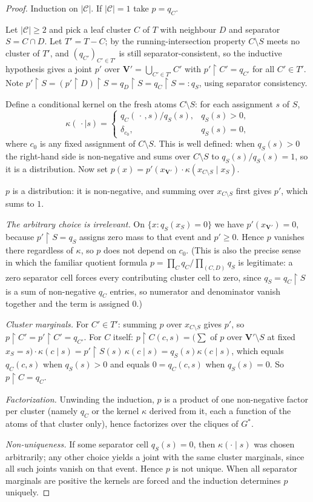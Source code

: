 \documentclass[11pt]{article}
\theoremstyle{definition}
\newcommand{\restr}{\!\restriction\!}
\begin{document}
\begin{proof}
Induction on $|\mathcal C|$. If $|\mathcal C|=1$ take $p=q_C$.

Let $|\mathcal C|\ge2$ and pick a leaf cluster $C$ of $T$ with neighbour $D$ and
separator $S=C\cap D$. Let $T'=T-C$; by the running-intersection property
$C\setminus S$ meets no cluster of $T'$, and $(q_{C'})_{C'\in T'}$ is still
separator-consistent, so the inductive hypothesis gives a joint $p'$ over
$\mathbf V'=\bigcup_{C'\in T'}C'$ with $p'\restr C'=q_{C'}$ for all
$C'\in T'$. Note
$p'\restr S=(p'\restr D)\restr S=q_D\restr S=q_C\restr S=:q_S$, using separator
consistency.

Define a conditional kernel on the fresh atoms $C\setminus S$: for each
assignment $s$ of $S$,
\[
  \kappa(\,\cdot\mid s)=
  \begin{cases}
    q_C(\,\cdot\,,s)/q_S(s), & q_S(s)>0,\\
    \delta_{c_0}, & q_S(s)=0,
  \end{cases}
\]
where $c_0$ is any fixed assignment of $C\setminus S$. This is well defined: when
$q_S(s)>0$ the right-hand side is non-negative and sums over $C\setminus S$ to
$q_S(s)/q_S(s)=1$, so it is a distribution. Now set
$p(x)=p'(x_{\mathbf V'})\cdot\kappa(x_{C\setminus S}\mid x_S)$.

$p$ is a distribution: it is non-negative, and summing over $x_{C\setminus S}$
first gives $p'$, which sums to $1$.

\emph{The arbitrary choice is irrelevant.} On $\{x:q_S(x_S)=0\}$ we have
$p'(x_{\mathbf V'})=0$, because $p'\restr S=q_S$ assigns zero mass to that event
and $p'\ge0$. Hence $p$ vanishes there regardless of $\kappa$, so $p$ does not
depend on $c_0$. (This is also the precise sense in which the familiar quotient
formula $p=\prod_C q_C/\prod_{(C,D)}q_S$ is legitimate: a zero separator cell
forces every contributing cluster cell to zero, since $q_S=q_C\restr S$ is a sum
of non-negative $q_C$ entries, so numerator and denominator vanish together and
the term is assigned $0$.)

\emph{Cluster marginals.} For $C'\in T'$: summing $p$ over $x_{C\setminus S}$
gives $p'$, so $p\restr C'=p'\restr C'=q_{C'}$. For $C$ itself:
$p\restr C(c,s)=\bigl(\sum$ of $p$ over $\mathbf V'\setminus S$ at fixed
$x_S=s\bigr)\cdot\kappa(c\mid s)=p'\restr S(s)\,\kappa(c\mid s)
=q_S(s)\kappa(c\mid s)$, which equals $q_C(c,s)$ when $q_S(s)>0$ and equals
$0=q_C(c,s)$ when $q_S(s)=0$. So $p\restr C=q_C$.

\emph{Factorization.} Unwinding the induction, $p$ is a product of one
non-negative factor per cluster (namely $q_C$ or the kernel $\kappa$ derived from
it, each a function of the atoms of that cluster only), hence factorizes over the
cliques of $G^\ast$.

\emph{Non-uniqueness.} If some separator cell $q_S(s)=0$, then
$\kappa(\cdot\mid s)$ was chosen arbitrarily; any other choice yields a joint
with the same cluster marginals, since all such joints vanish on that event.
Hence $p$ is not unique. When all separator marginals are positive the kernels
are forced and the induction determines $p$ uniquely.
\end{proof}
\end{document}
